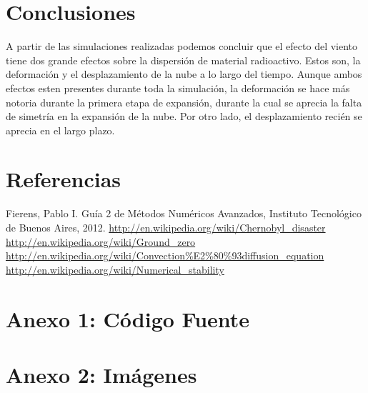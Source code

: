 \documentclass[twocolumn,a4paper,10pt]{article}
\begin{document}
\section{Conclusiones}
\label{sec:conclusiones}

A partir de las simulaciones realizadas podemos concluir que el efecto del viento tiene dos grande efectos sobre la dispersi\'on de material radioactivo. Estos son, 
la deformaci\'on y el desplazamiento de la nube a lo largo del tiempo. Aunque ambos efectos esten presentes durante toda la simulaci\'on, la deformaci\'on se hace
m\'as notoria durante la primera etapa de expansi\'on, durante la cual se aprecia la falta de simetr\'ia en la expansi\'on de la nube. 
Por otro lado, el desplazamiento reci\'en se aprecia en el largo plazo.


\section*{Referencias}

\begin{thebibliography}{99}

     Fierens, Pablo I. Gu\'ia 2 de M\'etodos Num\'ericos Avanzados, Instituto Tecnol\'ogico de Buenos Aires, 2012.
     \url{http://en.wikipedia.org/wiki/Chernobyl_disaster}
     \url{http://en.wikipedia.org/wiki/Ground_zero}
     \url{http://en.wikipedia.org/wiki/Convection%E2%80%93diffusion_equation}
     \url{http://en.wikipedia.org/wiki/Numerical_stability}

\end{thebibliography}

\clearpage
\section*{Anexo 1: C\'odigo Fuente}

    
    

\clearpage
\section*{Anexo 2: Im\'agenes}
\end{document}
